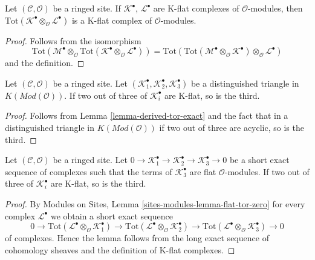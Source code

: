 \begin{lemma}
\label{lemma-tensor-product-K-flat}
Let $(\mathcal{C}, \mathcal{O})$ be a ringed site.
If $\mathcal{K}^\bullet$, $\mathcal{L}^\bullet$ are K-flat complexes
of $\mathcal{O}$-modules, then
$\text{Tot}(\mathcal{K}^\bullet \otimes_\mathcal{O} \mathcal{L}^\bullet)$
is a K-flat complex of $\mathcal{O}$-modules.
\end{lemma}

\begin{proof}
Follows from the isomorphism
$$
\text{Tot}(\mathcal{M}^\bullet \otimes_\mathcal{O}
\text{Tot}(\mathcal{K}^\bullet \otimes_\mathcal{O} \mathcal{L}^\bullet))
=
\text{Tot}(\text{Tot}(\mathcal{M}^\bullet \otimes_\mathcal{O}
\mathcal{K}^\bullet) \otimes_\mathcal{O} \mathcal{L}^\bullet)
$$
and the definition.
\end{proof}

\begin{lemma}
\label{lemma-K-flat-two-out-of-three}
Let $(\mathcal{C}, \mathcal{O})$ be a ringed site.
Let $(\mathcal{K}_1^\bullet, \mathcal{K}_2^\bullet, \mathcal{K}_3^\bullet)$
be a distinguished triangle in $K(\textit{Mod}(\mathcal{O}))$.
If two out of three of $\mathcal{K}_i^\bullet$ are K-flat, so is the third.
\end{lemma}

\begin{proof}
Follows from
Lemma \ref{lemma-derived-tor-exact}
and the fact that in a distinguished triangle in
$K(\textit{Mod}(\mathcal{O}))$
if two out of three are acyclic, so is the third.
\end{proof}

\begin{lemma}
\label{lemma-K-flat-two-out-of-three-ses}
Let $(\mathcal{C}, \mathcal{O})$ be a ringed site. Let
$0 \to \mathcal{K}_1^\bullet \to \mathcal{K}_2^\bullet \to
\mathcal{K}_3^\bullet \to 0$ be a short exact sequence of complexes
such that the terms of $\mathcal{K}_3^\bullet$ are flat $\mathcal{O}$-modules.
If two out of three of $\mathcal{K}_i^\bullet$ are K-flat, so is the third.
\end{lemma}

\begin{proof}
By Modules on Sites, Lemma \ref{sites-modules-lemma-flat-tor-zero}
for every complex $\mathcal{L}^\bullet$
we obtain a short exact sequence
$$
0 \to
\text{Tot}(\mathcal{L}^\bullet \otimes_\mathcal{O} \mathcal{K}_1^\bullet) \to
\text{Tot}(\mathcal{L}^\bullet \otimes_\mathcal{O} \mathcal{K}_2^\bullet) \to
\text{Tot}(\mathcal{L}^\bullet \otimes_\mathcal{O} \mathcal{K}_3^\bullet) \to 0
$$
of complexes. Hence the lemma follows from the long exact sequence of
cohomology sheaves and the definition of K-flat complexes.
\end{proof}

